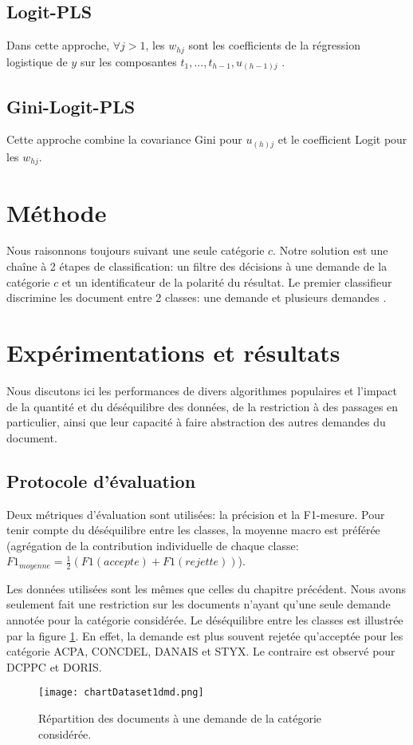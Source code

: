 \subsection{Logit-PLS}
Dans cette approche, $\forall j > 1$, les $w_{hj} $ sont les coefficients de la régression logistique de $y$ sur les composantes $t_1, ..., t_{h-1}, u_{(h-1)j}$ \cite{tenenhaus2005logitpls}.

\subsection{Gini-Logit-PLS}
Cette approche combine la covariance Gini pour $u_{(h)j}$ et le coefficient Logit pour les $w_{hj}$.


\section{Méthode}
Nous raisonnons toujours suivant une seule catégorie $c$. Notre solution est une chaîne à 2 étapes de classification: un filtre des décisions à une demande de la catégorie $c$ et un identificateur de la polarité du résultat. Le premier classifieur discrimine les document entre 2 classes: \og une demande \fg{} et \og plusieurs demandes \fg{}.

\section{Expérimentations et résultats}
\label{sec:sensresultat:experimentations}
Nous discutons ici les performances de divers algorithmes populaires et l'impact de la quantité et du déséquilibre des données, de la restriction à des passages en particulier, ainsi que leur capacité à faire abstraction des autres demandes du document. 

\subsection{Protocole d'évaluation}
Deux métriques d'évaluation sont utilisées: la précision et la F1-mesure. Pour tenir compte du déséquilibre entre les classes, la moyenne macro est préférée (agrégation de la contribution individuelle de chaque classe: $F1_{moyenne} = \frac{1}{2}(F1({accepte}) + F1({rejette}))$).

Les données utilisées sont les mêmes que celles du chapitre précédent. Nous avons seulement fait une restriction sur les documents n'ayant qu'une seule demande annotée pour la catégorie considérée. Le déséquilibre entre les classes est illustrée par la figure \ref{fig:sensresultat:stat-1dmd}. En effet, la demande est plus souvent rejetée qu'acceptée pour les catégorie ACPA, CONCDEL, DANAIS et STYX. Le contraire est observé pour DCPPC et DORIS.
\begin{figure}[htb]
\texttt{[image: chartDataset1dmd.png]}
\caption{Répartition des documents à une demande de la catégorie considérée.}\label{fig:sensresultat:stat-1dmd}
\end{figure}

